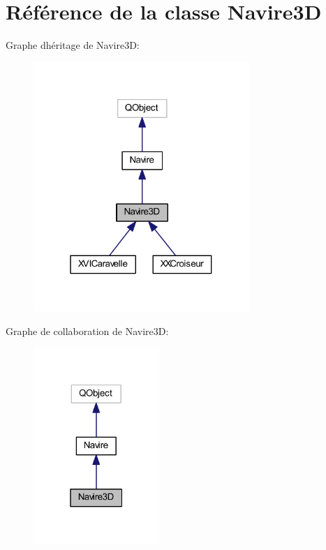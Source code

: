 \hypertarget{class_navire3_d}{}\section{Référence de la classe Navire3D}
\label{class_navire3_d}


Graphe d\textquotesingle{}héritage de Navire3D\+:
\nopagebreak
\begin{figure}[H]
\begin{center}
\leavevmode
\includegraphics[width=232pt]{class_navire3_d__inherit__graph}
\end{center}
\end{figure}


Graphe de collaboration de Navire3D\+:
\nopagebreak
\begin{figure}[H]
\begin{center}
\leavevmode
\includegraphics[width=135pt]{class_navire3_d__coll__graph}
\end{center}
\end{figure}
